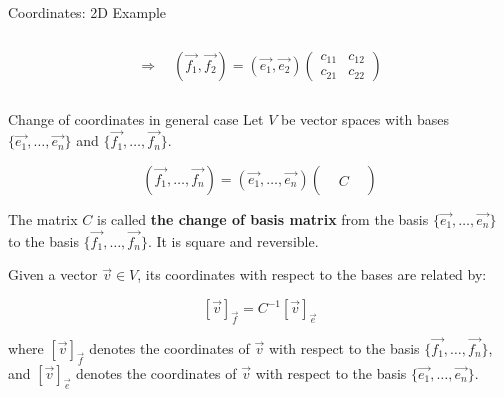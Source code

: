 \documentclass[fullscreen=true, bookmarks=true, hyperref={pdfencoding=unicode}]{beamer}
\begin{document}
\begin{frame}{Coordinates: 2D Example}
\begin{columns}
\begin{column}{0.4\paperwidth}
        $$\Rightarrow \quad (\vec{f_1}, \vec{f_2}) = (\vec{e_1}, \vec{e_2})
        \begin{pmatrix} 
          c_{11} & c_{12} \\ 
          c_{21} & c_{22}
        \end{pmatrix}$$
      \end{column}
    \end{columns}
\end{frame}


\begin{frame}{Change of coordinates in general case}
  Let $V$ be vector spaces with bases 
  $\{\vec{e_1}, \ldots, \vec{e_n}\}$ and 
  $\{\vec{f_1}, \ldots, \vec{f_n}\}$. 

  $$(\vec{f_1}, \ldots, \vec{f_n}) = (\vec{e_1}, \ldots, \vec{e_n})
  \begin{pmatrix} 
     &   & \\ 
     & C & \\ 
     &   & 
  \end{pmatrix}$$

  The matrix $C$ is called \textbf{the change of basis matrix} 
  from the basis $\{\vec{e_1}, \ldots, \vec{e_n}\}$ 
  to the basis $\{\vec{f_1}, \ldots, \vec{f_n}\}$. It is square and reversible.

  \pause\vspace{1em}
  Given a vector $\vec{v} \in V$, 
  its coordinates with respect to the 
  bases are related by:

  $$[\vec{v}]_{\vec{f}} = C^{-1}[\vec{v}]_{\vec{e}}$$

  where $[\vec{v}]_{\vec{f}}$ denotes the coordinates of $\vec{v}$ 
  with respect to the basis $\{\vec{f_1}, \ldots, \vec{f_n}\}$, 
  and $[\vec{v}]_{\vec{e}}$ denotes the coordinates of $\vec{v}$ with 
  respect to the basis $\{\vec{e_1}, \ldots, \vec{e_n}\}$.
\end{frame}
\end{document}

